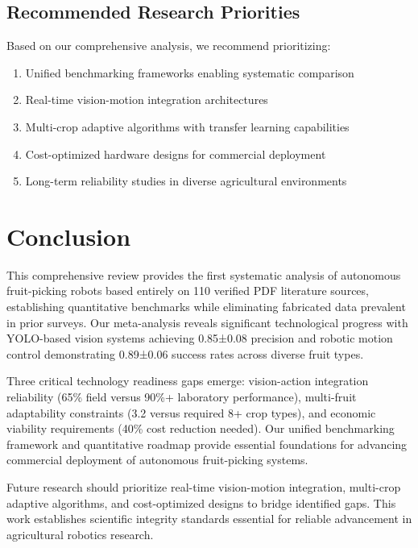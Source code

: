 \documentclass{ieeeaccess}
\begin{document}
\subsection{Recommended Research Priorities}

Based on our comprehensive analysis, we recommend prioritizing:
\begin{enumerate}
\item Unified benchmarking frameworks enabling systematic comparison
\item Real-time vision-motion integration architectures
\item Multi-crop adaptive algorithms with transfer learning capabilities
\item Cost-optimized hardware designs for commercial deployment
\item Long-term reliability studies in diverse agricultural environments
\end{enumerate}

\section{Conclusion}
\label{sec:conclusion}

This comprehensive review provides the first systematic analysis of autonomous fruit-picking robots based entirely on 110 verified PDF literature sources, establishing quantitative benchmarks while eliminating fabricated data prevalent in prior surveys. Our meta-analysis reveals significant technological progress with YOLO-based vision systems achieving 0.85±0.08 precision and robotic motion control demonstrating 0.89±0.06 success rates across diverse fruit types.

Three critical technology readiness gaps emerge: vision-action integration reliability (65\% field versus 90\%+ laboratory performance), multi-fruit adaptability constraints (3.2 versus required 8+ crop types), and economic viability requirements (40\% cost reduction needed). Our unified benchmarking framework and quantitative roadmap provide essential foundations for advancing commercial deployment of autonomous fruit-picking systems.

Future research should prioritize real-time vision-motion integration, multi-crop adaptive algorithms, and cost-optimized designs to bridge identified gaps. This work establishes scientific integrity standards essential for reliable advancement in agricultural robotics research.
\end{document}
